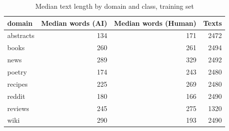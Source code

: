 \begin{table}[!t]
\centering
\caption{Median text length by domain and class, training set}
\label{tab:length_by_domain}
\footnotesize
\begin{tabular}{lrrr}
\toprule
\textbf{domain} & \textbf{Median words (AI)} & \textbf{Median words (Human)} & \textbf{Texts} \\
\midrule
abstracts & 134 & 171 & 2472 \\
books & 260 & 261 & 2494 \\
news & 289 & 329 & 2492 \\
poetry & 174 & 243 & 2480 \\
recipes & 225 & 269 & 2480 \\
reddit & 180 & 166 & 2490 \\
reviews & 245 & 275 & 1320 \\
wiki & 290 & 193 & 2490 \\
\bottomrule
\end{tabular}
\end{table}
